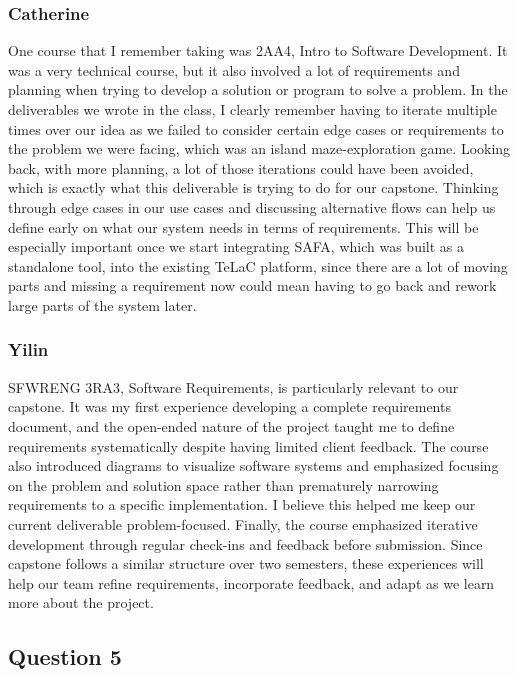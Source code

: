 \documentclass[12pt]{article}
\begin{document}
\subsubsection*{Catherine}
One course that I remember taking was 2AA4, Intro to Software Development. It
was a very technical course, but it also involved a lot of requirements and planning
when trying to develop a solution or program to solve a problem. In the deliverables
we wrote in the class, I clearly remember having to iterate multiple times over our idea
as we failed to consider certain edge cases or requirements to the problem we were facing,
which was an island maze-exploration game. Looking back, with more planning, a lot of those iterations could have been avoided, which is exactly what this
deliverable is trying to do for our capstone. Thinking through edge cases in
our use cases and discussing alternative flows can help us define early on what
our system needs in terms of requirements. This will be especially important
once we start integrating SAFA, which was built as a standalone tool, into the existing
TeLaC platform, since there are a lot of moving parts and missing a requirement now
could mean having to go back and rework large parts of the system later.

\subsubsection*{Yilin}
SFWRENG 3RA3, Software Requirements, is particularly relevant to our capstone. It was my first experience developing a complete requirements document, and the open-ended nature of the project taught me to define requirements systematically despite having limited client feedback.
The course also introduced diagrams to visualize software systems and emphasized focusing on the problem and solution space rather than prematurely narrowing requirements to a specific implementation. I believe this helped me keep our current deliverable problem-focused.
Finally, the course emphasized iterative development through regular check-ins and feedback before submission. Since capstone follows a similar structure over two semesters, these experiences will help our team refine requirements, incorporate feedback, and adapt as we learn more about the project.

\subsection*{Question 5}
\end{document}
